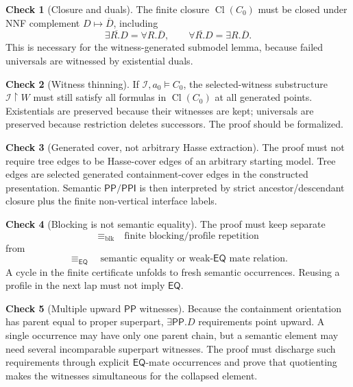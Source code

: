 \documentclass[11pt]{article}
\newcommand{\Cl}{\operatorname{Cl}}
\newcommand{\EQ}{\mathsf{EQ}}
\newcommand{\PP}{\mathsf{PP}}
\newcommand{\PPI}{\mathsf{PPI}}
\newcommand{\blk}{\equiv_{\mathrm{blk}}}
\newcommand{\eqrel}{\equiv_{\EQ}}
\theoremstyle{definition}
\newtheorem{checkitem}{Check}
\theoremstyle{plain}
\begin{document}
\begin{checkitem}[Closure and duals]
The finite closure \(\Cl(C_0)\) must be closed under NNF complement \(D\mapsto \overline D\), including
\[
\overline{\exists R.D}=\forall R.\overline D,
\qquad
\overline{\forall R.D}=\exists R.\overline D.
\]
This is necessary for the witness-generated submodel lemma, because failed universals are witnessed by existential duals.
\end{checkitem}

\begin{checkitem}[Witness thinning]
If \(\mathcal I,a_0\models C_0\), the selected-witness substructure \(\mathcal I\upharpoonright W\) must still satisfy all formulas in \(\Cl(C_0)\) at all generated points.  Existentials are preserved because their witnesses are kept; universals are preserved because restriction deletes successors.  The proof should be formalized.
\end{checkitem}

\begin{checkitem}[Generated cover, not arbitrary Hasse extraction]
The proof must not require tree edges to be Hasse-cover edges of an arbitrary starting model.  Tree edges are selected generated containment-cover edges in the constructed presentation.  Semantic \(\PP/\PPI\) is then interpreted by strict ancestor/descendant closure plus the finite non-vertical interface labels.
\end{checkitem}

\begin{checkitem}[Blocking is not semantic equality]
The proof must keep separate
\[
\blk \quad\text{finite blocking/profile repetition}
\]
from
\[
\eqrel \quad\text{semantic equality or weak-}\EQ\text{ mate relation}.
\]
A cycle in the finite certificate unfolds to fresh semantic occurrences.  Reusing a profile in the next lap must not imply \(\EQ\).
\end{checkitem}

\begin{checkitem}[Multiple upward \(\PP\) witnesses]
Because the containment orientation has parent equal to proper superpart, \(\exists\PP.D\) requirements point upward.  A single occurrence may have only one parent chain, but a semantic element may need several incomparable superpart witnesses.  The proof must discharge such requirements through explicit \(\EQ\)-mate occurrences and prove that quotienting makes the witnesses simultaneous for the collapsed element.
\end{checkitem}
\end{document}

